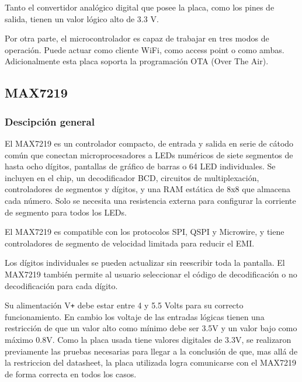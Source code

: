     Tanto el convertidor analógico digital que posee la placa, como los pines de salida, tienen un valor lógico alto de 3.3 V. 
    
    Por otra parte, el microcontrolador es capaz de trabajar en tres modos de operación. Puede actuar como cliente WiFi, como access point o como ambas. Adicionalmente esta placa soporta la programación OTA (Over The Air).
    

    \subsection{MAX7219}

        \subsubsection{Descipción general}
        El MAX7219 es un controlador compacto, de entrada y salida en serie de cátodo común que conectan microprocesadores a LEDs numéricos de siete segmentos de hasta ocho dígitos, pantallas de gráfico de barras o 64 LED individuales. Se incluyen en el chip, un decodificador BCD, circuitos de multiplexación, controladores de segmentos y dígitos, y una RAM estática de 8x8 que almacena cada número. Solo se necesita una resistencia externa para configurar la corriente de segmento para todos los LEDs.
        
        El MAX7219 es compatible con los protocolos SPI, QSPI y Microwire, y tiene controladores de segmento de velocidad limitada para reducir el EMI.
        
        Los dígitos individuales se pueden actualizar sin reescribir toda la pantalla. El MAX7219 también permite al usuario seleccionar el código de decodificación o no decodificación para cada dígito.
        
        Su alimentación V\texttt{+} debe estar entre 4 y 5.5 Volts para su correcto funcionamiento. En cambio los voltaje de las entradas lógicas tienen una restricción de que un valor alto como mínimo debe ser 3.5V y un valor bajo como máximo 0.8V. Como la placa usada tiene valores digitales de 3.3V, se realizaron previamente las pruebas necesarias para llegar a la conclusión de que, mas allá de la restriccion del datasheet, la placa utilizada logra comunicarse con el MAX7219 de forma correcta en todos los casos. 
        
